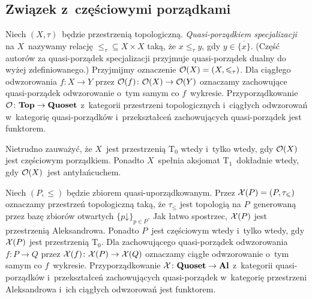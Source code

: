 \subsection{Związek z~częściowymi porządkami}
Niech $(X,\tau)$~będzie przestrzenią topologiczną. \textit{Quasi-porządkiem specjalizacji} na $X$~nazywamy relację $\leq_\tau\subseteq X\times X$ taką, że $x\leq_\tau y$, gdy $y\in \overline{\{x\}}$. (Część autorów za quasi-porządek specjalizacji przyjmuje quasi-porządek dualny do wyżej zdefiniowanego.) Przyjmijmy oznaczenie $\mathcal{O}(X)=(X,\leqslant_\tau)$. Dla ciągłego odwzorowania $f\colon X\to Y$ przez $\mathcal{O}(f)\colon \mathcal{O}(X)\to \mathcal{O}(Y)$ oznaczamy zachowujące quasi-porządek odwzorowanie o~tym samym co $f$~wykresie. Przyporządkowanie $\mathcal{O}\colon \mathbf{\mathbf{T}op}\to \mathbf{\mathbf{Q}uoset}$ z~kategorii przestrzeni topologicznych i~ciągłych odwzorowań w~kategorię quasi-porządków i~przekształceń zachowujących quasi-porządek jest funktorem.

Nietrudno zauważyć, że $X$~jest przestrzenią $\mathrm{T_0}$ wtedy i~tylko wtedy, gdy $\mathcal{O}(X)$ jest częściowym porządkiem. Ponadto $X$~spełnia aksjomat $\mathrm{T_1}$~dokładnie wtedy, gdy $\mathcal{O}(X)$~jest antyłańcuchem.

Niech $(P,\leq)$ będzie zbiorem quasi-uporządkowanym. Przez $\mathcal{X}(P)=(P,\tau_\leqslant)$ oznaczamy przestrzeń topologiczną taką, że $\tau_\leq$ jest topologią na $P$~generowaną przez bazę zbiorów otwartych $\{p\mathord{\downarrow}\}_{p\in P}$. Jak łatwo spostrzec, $\mathcal{X}(P)$ jest przestrzenią Aleksandrowa. Ponadto $P$~jest częściowym wtedy i~tylko wtedy, gdy $\mathcal{X}(P)$ jest przestrzenią $\mathrm{T_0}$. Dla zachowującego quasi-porządek odwzorowania $f\colon P\to Q$ przez $\mathcal{X}(f)\colon \mathcal{X}(P)\to \mathcal{X}(Q)$ oznaczamy ciągłe odwzorowanie o~tym samym co $f$~wykresie. Przyporządkowanie $\mathcal{X}\colon \mathbf{\mathbf{Q}uoset}\to \mathbf{\mathbf{A}l}$ z~kategorii quasi-porządków i~przekształceń zachowujących quasi-porządek w~kategorię przestrzeni Aleksandrowa i~ich ciągłych odwzorowań jest funktorem.

